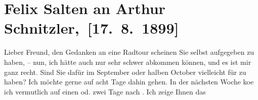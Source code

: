 

         
         \renewcommand{\erwaehntePersonen}{Personen: Richard Beer-Hofmann, Houston Stewart Chamberlain, Theodor Herzl, Felix Salten, Ottilie Salten, Franz Servaes, Karl von Thaler, Jakob Wassermann}
         \renewcommand{\erwaehnteInstitutionen}{Institutionen: Bruckmann Verlag, Neue Freie Presse}
         \renewcommand{\erwaehnteOrte}{Orte: Bad Ischl, Dubrovnik, München, Seeboden, Wien}
         \renewcommand{\erwaehnteWerke}{Werke: Decadence-Romane, Die Grundlagen des Neunzehnten Jahrhunderts. 2 Bde., Die Welt (Wien), Neue Freie Presse, Tagebuch, »Das fremde Volk«, »Das fremde Volk«. I., »Das fremde Volk«. II., »Das fremde Volk«. III.}
               \section[ Felix Salten an Arthur Schnitzler, {[}17. 8. 1899{]}]{ Felix Salten an Arthur Schnitzler, {[}17. 8. 1899{]}}\nopagebreak{}\rehead{ }\begin{ledgroupsized}[t]{13cm}\normalsize\beginnumbering \toendnotes[C]{\smallbreak\pagebreak[2]} 
\toendnotes[C]{\smallbreak}\pstart
           \noindent{}{\pb}Lieber Freund, den Gedanken an eine Radtour scheinen Sie selbst
               aufgegeben zu haben, – nun, ich hätte auch nur sehr schwer abkommen können, und es
               ist mir ganz recht. Sind Sie dafür im September oder
               halben October vielleicht für \label{K_L03297-1v}\label{K_L03297-1h} zu haben? Ich
               möchte gerne auf acht Tage dahin gehen. In der nächsten Woche ko{\geminationm}e ich vermutlich auf einen od. zwei Tage nach \label{K_L03297-2v}\label{K_L03297-2h}. Ich zeige Ihnen das

\end{ledgroupsized}
